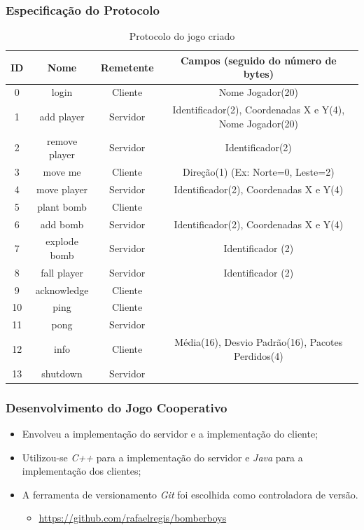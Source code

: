 \documentclass{beamer}
\begin{document}
\begin{frame} \frametitle{Especificação do Protocolo}
\begin{table}
  \center
  \tiny
  \begin{tabular}{|c|c|c|c|}
  \hline
    \textbf{ID} & \textbf{Nome} & \textbf{Remetente} & \textbf{Campos (seguido do número de bytes)} \\ \hline
    0 & login & Cliente & Nome Jogador(20)  \\ \hline
    1 & add player & Servidor & Identificador(2), Coordenadas X e Y(4), Nome Jogador(20)\\ \hline
    2 & remove player & Servidor & Identificador(2) \\ \hline
    3 & move me & Cliente & Direção(1) (Ex: Norte=0, Leste=2) \\ \hline
    4 & move player & Servidor & Identificador(2), Coordenadas X e Y(4) \\ \hline
    5 & plant bomb & Cliente & \\ \hline
    6 & add bomb & Servidor &  Identificador(2), Coordenadas X e Y(4)  \\ \hline
    7 & explode bomb & Servidor & Identificador (2) \\ \hline
    8 & fall player & Servidor & Identificador (2) \\ \hline
    9 & acknowledge & Cliente & \\ \hline
   10 & ping & Cliente & \\ \hline
   11 & pong & Servidor & \\ \hline
   12 & info & Cliente & Média(16), Desvio Padrão(16), Pacotes Perdidos(4)  \\ \hline
   13 & shutdown & Servidor &\\ \hline
  \end{tabular} 
\caption{Protocolo do jogo criado}
\label{tab:protocolo}
\end{table} 
\end{frame}

\begin{frame} \frametitle{Desenvolvimento do Jogo Cooperativo}
\begin{itemize}
	\item \justifying Envolveu a implementação do servidor e a implementação do cliente;
	\item \justifying Utilizou-se \emph{C++} \cite{CPP} para a implementação do servidor e \emph{Java} \cite{Java} para a implementação dos
clientes;
	\item \justifying A ferramenta de versionamento \emph{Git} \cite{Git} foi escolhida como controladora de versão.
	\begin{itemize}
		\item \url{https://github.com/rafaelregis/bomberboys}
	\end{itemize}
\end{itemize}
\end{frame}
\end{document}
